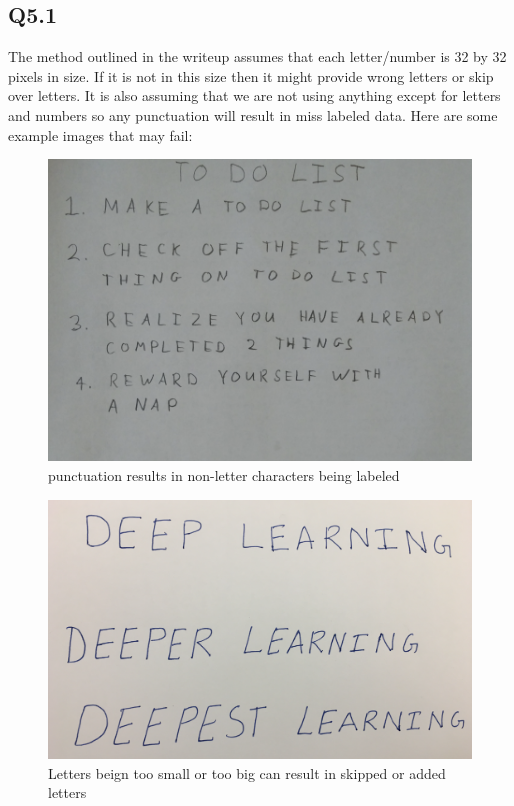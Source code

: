 \documentclass{article}
\begin{document}
\subsection*{Q5.1}
\begin{flushleft}
    The method outlined in the writeup assumes that each letter/number is 32 by 32 pixels in size.
    If it is not in this size then it might provide wrong letters or skip over letters. It is also assuming that 
    we are not using anything except for letters and numbers so any punctuation will result in miss labeled 
    data. Here are some example images that may fail:
\end{flushleft}
    \begin{figure}[htbp]
    \centering
    \includegraphics[width=0.4\linewidth]{punctuation.png}
    \caption{punctuation results in non-letter characters being labeled}
  \end{figure}
  \begin{figure}[htbp]
    \centering
    \includegraphics[width=0.4\linewidth]{close.png}
    \caption{Letters beign too small or too big can result in skipped or added letters}
  \end{figure}
\newpage
\end{document}
